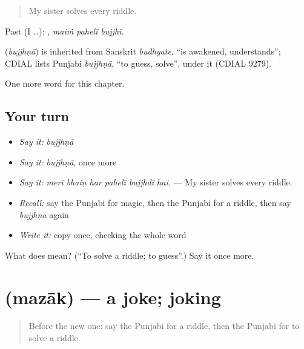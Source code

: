 \begin{quote}
My sister solves every riddle.
\end{quote}

Past (I …):   , \emph{maiṁ pahelī bujjhī}.

\begin{cousinweb}
\textbf{} (\emph{bujjhṇā}) is inherited from Sanskrit \emph{budhyate}, \textquotedblleft{}is awakened, understands\textquotedblright{}; CDIAL lists Punjabi \emph{bujjhṇā}, \textquotedblleft{}to guess, solve\textquotedblright{}, under it (CDIAL 9279).
\end{cousinweb}

\begin{grammarlens}[title={What you've built}]
One more word for this chapter.
\end{grammarlens}

\subsection*{Your turn}
\begin{itemize}
\raggedright
  \item \emph{Say it:} \emph{bujjhṇā}
  \item \emph{Say it:} \emph{bujjhṇā}, once more
  \item \emph{Say it:} \emph{merī bhaiṇ har pahelī bujjhdī hai.} — My sister solves every riddle.
  \item \emph{Recall:} say the Punjabi for magic, then the Punjabi for a riddle, then say \emph{bujjhṇā} again
  \item \emph{Write it:} copy \textbf{} once, checking the whole word
\end{itemize}

\begin{tcolorbox}[breakable,colback=teal!4,colframe=teal!35!black,title={Before you move on}]
What does  mean? (\textquotedblleft{}To solve a riddle; to guess\textquotedblright{}.) Say it once more.
\end{tcolorbox}
\section[\texorpdfstring{\pa{ਮਜ਼ਾਕ} (mazāk)}{ਮਜ਼ਾਕ (mazāk)}]{ (mazāk) — a joke; joking}

\label{lesson:PA-C355-mazak}



\begin{quote}
Before the new one: say the Punjabi for a riddle, then the Punjabi for to solve a riddle.
\end{quote}

